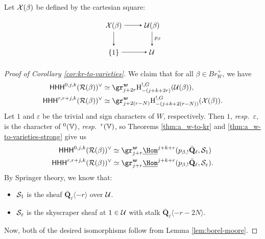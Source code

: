 \documentclass[a4paper,10pt,leqno]{amsart}
\theoremstyle{plain}
\theoremstyle{plain}
\theoremstyle{plain}
\theoremstyle{definition}
\theoremstyle{remark}
\let\Alt\relax
\DeclareMathOperator{\Alt}{\text{$\Lambda$}}
\newcommand{\Br}{\mathit{Br}}
\newcommand{\QL}{\bar{\mathbf{Q}}_\ell}
\begin{document}
\subsection{}\label{subsec:kr-to-varieties}

Let $\cal{X}(\beta)$ be defined by the cartesian square:
\begin{equation}
\begin{tikzpicture}[baseline=(current bounding box.center), >=stealth]
\matrix(m)[matrix of math nodes, row sep=2em, column sep=2.5em, text height=2ex, text depth=0.5ex]
{	\cal{X}(\beta)
		&\cal{U}(\beta)\\
	\{1\}
		&\cal{U}\\
		};
\path[->,font=\scriptsize, auto]
(m-1-1)		edge (m-1-2)
(m-1-1)		edge (m-2-1)
(m-1-2)		edge node{$p_\beta$} (m-2-2)
(m-2-1)		edge (m-2-2);
\end{tikzpicture}
\end{equation}

\begin{proof}[Proof of Corollary \ref{cor:kr-to-varieties}]
We claim that for all $\beta \in \Br_W^+$, we have
\begin{align}
\sf{HHH}^{0, j, k}(\cal{R}(\beta))^\vee
	&\simeq \gr_{j + 2r}^{\bm{w}} \ur{H}_{-(j + k + 2r)}^{!, G}(\cal{U}(\beta)),\\
\sf{HHH}^{r, r + j, k}(\cal{R}(\beta))^\vee
	&\simeq \gr_{j + 2(r - N)}^{\bm{w}} \ur{H}_{-(j + k + 2(r - N))}^{!, G}(\cal{X}(\beta)).
\end{align}
Let $1$ and $\varepsilon$ be the trivial and sign characters of $W$, respectively.
Then $1$, \emph{resp.}\ $\varepsilon$, is the character of $\Alt^0(\bb{V})$, \emph{resp.}\ $\Alt^r(\bb{V})$, so Theorems \ref{thm:a_w-to-kr} and \ref{thm:a_w-to-varieties-strong} give us
\begin{align}
\sf{HHH}^{0, j, k}(\cal{R}(\beta))^\vee
	&\simeq \gr_{j + r}^{\bm{w}} \SHom^{j + k + r}(p_{\beta, !}\QL, \cal{S}_1)\\
\sf{HHH}^{r, r + j, k}(\cal{R}(\beta))^\vee
	&\simeq \gr_{j + r}^{\bm{w}} \SHom^{j + k + r}(p_{\beta, !}\QL, \cal{S}_\varepsilon).
\end{align}
By Springer theory, we know that:
\begin{itemize}
\item 	$\cal{S}_1$ is the sheaf $\QL\langle -r\rangle$ over $\cal{U}$.
\item 	$\cal{S}_\varepsilon$ is the skyscraper sheaf at $1 \in \cal{U}$ with stalk $\QL\langle -r - 2N\rangle$.
\end{itemize}
Now, both of the desired isomorphisms follow from Lemma \ref{lem:borel-moore}.
\end{proof}
\end{document}
